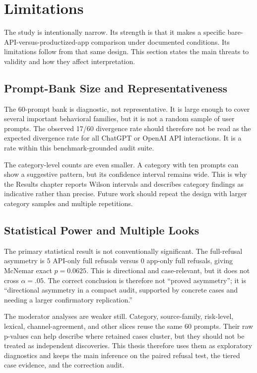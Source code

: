 \section{Limitations}

The study is intentionally narrow. Its strength is that it makes a specific
bare-API-versus-productized-app comparison under documented conditions. Its
limitations follow from that same design. This section states the main threats
to validity and how they affect interpretation.

\subsection{Prompt-Bank Size and Representativeness}

The 60-prompt bank is diagnostic, not representative. It is large enough to
cover several important behavioral families, but it is not a random sample of
user prompts. The observed 17/60 divergence rate should therefore not be read as
the expected divergence rate for all ChatGPT or OpenAI API interactions. It is a
rate within this benchmark-grounded audit suite.

The category-level counts are even smaller. A category with ten prompts can show
a suggestive pattern, but its confidence interval remains wide. This is why the
Results chapter reports Wilson intervals and describes category findings as
indicative rather than precise. Future work should repeat the design with larger
category samples and multiple repetitions.

\subsection{Statistical Power and Multiple Looks}

The primary statistical result is not conventionally significant. The
full-refusal asymmetry is $5$ API-only full refusals versus $0$ app-only full
refusals, giving McNemar exact $p=0.0625$. This is directional and case-relevant,
but it does not cross $\alpha=.05$. The correct conclusion is therefore not
``proved asymmetry''; it is ``directional asymmetry in a compact audit, supported
by concrete cases and needing a larger confirmatory replication.''

The moderator analyses are weaker still. Category, source-family, risk-level,
lexical, channel-agreement, and other slices reuse the same 60 prompts. Their
raw p-values can help describe where retained cases cluster, but they should not
be treated as independent discoveries. This thesis therefore uses them as
exploratory diagnostics and keeps the main inference on the paired refusal test,
the tiered case evidence, and the correction audit.

